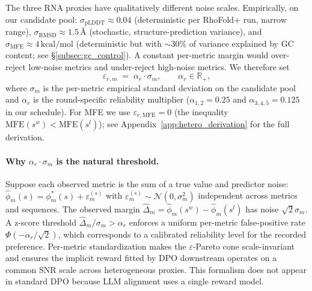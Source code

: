 The three RNA proxies have qualitatively different noise scales. Empirically, on our candidate pool: $\sigma_{\text{pLDDT}} \approx 0.04$ (deterministic per RhoFold+ run, narrow range), $\sigma_{\text{RMSD}} \approx 1.5\,\text{\AA}$ (stochastic, structure-prediction variance), and $\sigma_{\text{MFE}} \approx 4\,\text{kcal/mol}$ (deterministic but with $\sim 30\%$ of variance explained by GC content; see \S\ref{subsec:gc_control}). A constant per-metric margin would over-reject low-noise metrics and under-reject high-noise metrics. We therefore set
\begin{equation}
\varepsilon_{r,m} \;=\; \alpha_r \cdot \sigma_m, \qquad \alpha_r \in \mathbb{R}_+,
\label{eq:variability_margin}
\end{equation}
where $\sigma_m$ is the per-metric empirical standard deviation on the candidate pool and $\alpha_r$ is the round-specific reliability multiplier ($\alpha_{1,2}=0.25$ and $\alpha_{3,4,5}=0.125$ in our schedule). For MFE we use $\varepsilon_{r,\text{MFE}}=0$ (the inequality $\text{MFE}(s^w) < \text{MFE}(s^l)$); see Appendix~\ref{app:hetero_derivation} for the full derivation.

\paragraph{Why $\alpha_r \cdot \sigma_m$ is the natural threshold.}
Suppose each observed metric is the sum of a true value and predictor noise: $\hat\phi_m(s) = \phi_m^*(s) + \varepsilon_m^{(s)}$ with $\varepsilon_m^{(s)} \sim \mathcal{N}(0, \sigma_m^2)$ independent across metrics and sequences. The observed margin $\hat\Delta_m = \hat\phi_m(s^w) - \hat\phi_m(s^l)$ has noise $\sqrt{2}\sigma_m$. A z-score threshold $\hat\Delta_m / \sigma_m > \alpha_r$ enforces a uniform per-metric false-positive rate $\Phi(-\alpha_r/\sqrt{2})$, which corresponds to a calibrated reliability level for the recorded preference. Per-metric standardization makes the $\varepsilon$-Pareto cone scale-invariant and ensures the implicit reward fitted by DPO downstream operates on a common SNR scale across heterogeneous proxies. This formalism does not appear in standard DPO because LLM alignment uses a single reward model.

